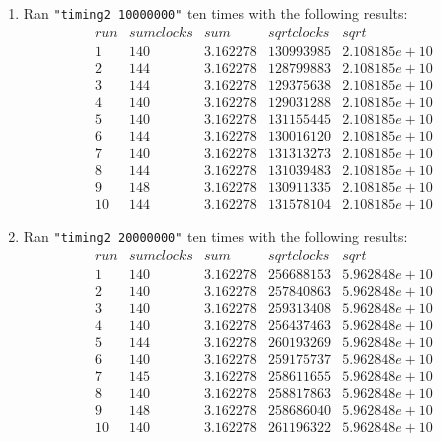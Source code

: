 \documentclass[12pt,fleqn,leqno,letterpaper]{article}
\begin{document}
\begin{enumerate}
    \item Ran \texttt{"timing2 10000000"} ten times with the following
        results:\\
        $$
        \begin{array}{lcccc}
            run & sum clocks & sum & sqrt clocks & sqrt \\


            1 & 140 & 3.162278 & 130993985 & 2.108185e+10 \\
            2 & 144 & 3.162278 & 128799883 & 2.108185e+10 \\
            3 & 144 & 3.162278 & 129375638 & 2.108185e+10 \\
            4 & 140 & 3.162278 & 129031288 & 2.108185e+10 \\
            5 & 140 & 3.162278 & 131155445 & 2.108185e+10 \\
            6 & 144 & 3.162278 & 130016120 & 2.108185e+10 \\
            7 & 140 & 3.162278 & 131313273 & 2.108185e+10 \\
            8 & 144 & 3.162278 & 131039483 & 2.108185e+10 \\
            9 & 148 & 3.162278 & 130911335 & 2.108185e+10 \\
            10 & 144 & 3.162278 & 131578104 & 2.108185e+10
        \end{array}
        $$

    \item Ran \texttt{"timing2 20000000"} ten times with the following
        results:\\
        $$
        \begin{array}{lcccc}
            run & sum clocks & sum & sqrt clocks & sqrt \\


            1 & 140 & 3.162278 & 256688153 & 5.962848e+10 \\
            2 & 140 & 3.162278 & 257840863 & 5.962848e+10 \\
            3 & 140 & 3.162278 & 259313408 & 5.962848e+10 \\
            4 & 140 & 3.162278 & 256437463 & 5.962848e+10 \\
            5 & 144 & 3.162278 & 260193269 & 5.962848e+10 \\
            6 & 140 & 3.162278 & 259175737 & 5.962848e+10 \\
            7 & 145 & 3.162278 & 258611655 & 5.962848e+10 \\
            8 & 140 & 3.162278 & 258817863 & 5.962848e+10 \\
            9 & 148 & 3.162278 & 258686040 & 5.962848e+10 \\
            10 & 140 & 3.162278 & 261196322 & 5.962848e+10
        \end{array}
        $$
\end{enumerate}


% 
\end{document}
